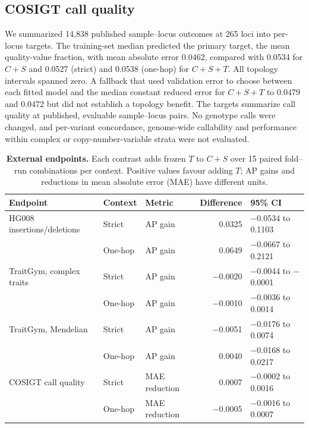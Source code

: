 \documentclass[11pt]{article}
\begin{document}
\begin{bibunit}[unsrtnat]
\subsection{COSIGT call quality}
We summarized 14,838 published sample--locus outcomes at 265 loci\cite{supp__bolognini2026cosigt} into per-locus targets. The training-set median predicted the primary target, the mean quality-value fraction, with mean absolute error 0.0462, compared with 0.0534 for $C+S$ and 0.0527 (strict) and 0.0538 (one-hop) for $C+S+T$. All topology intervals spanned zero. A fallback that used validation error to choose between each fitted model and the median constant reduced error for $C+S+T$ to 0.0479 and 0.0472 but did not establish a topology benefit. The targets summarize call quality at published, evaluable sample--locus pairs. No genotype calls were changed, and per-variant concordance, genome-wide callability and performance within complex or copy-number-variable strata were not evaluated.

\begin{table}[H]
\centering
\caption{\textbf{External endpoints.} Each contrast adds frozen $T$ to $C+S$ over 15 paired fold--run combinations per context. Positive values favour adding $T$; AP gains and reductions in mean absolute error (MAE) have different units.}
\label{S-stab:external}
\footnotesize
\begin{tabular}{@{}lllrl@{}}
\toprule
Endpoint & Context & Metric & Difference & 95\% CI \\
\midrule
HG008 insertions/deletions & Strict & AP gain & 0.0325 & $-$0.0534 to 0.1103 \\
 & One-hop & AP gain & 0.0649 & $-$0.0667 to 0.2121 \\
TraitGym, complex traits & Strict & AP gain & $-$0.0020 & $-$0.0044 to $-$0.0001 \\
 & One-hop & AP gain & $-$0.0010 & $-$0.0036 to 0.0014 \\
TraitGym, Mendelian & Strict & AP gain & $-$0.0051 & $-$0.0176 to 0.0074 \\
 & One-hop & AP gain & 0.0040 & $-$0.0168 to 0.0217 \\
COSIGT call quality & Strict & MAE reduction & 0.0007 & $-$0.0002 to 0.0016 \\
 & One-hop & MAE reduction & $-$0.0005 & $-$0.0016 to 0.0007 \\
\bottomrule
\end{tabular}
\end{table}


\end{bibunit}
\end{document}
